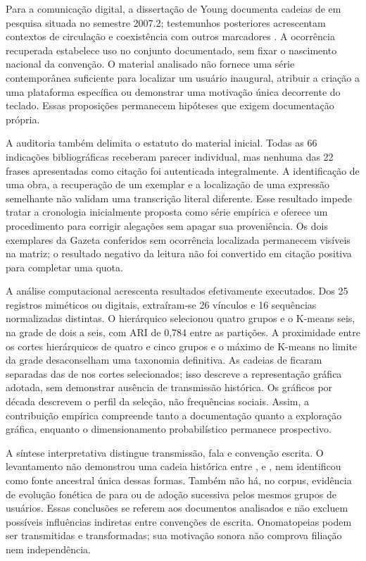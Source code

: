 Para a comunicação digital, a dissertação de Young documenta cadeias de  em pesquisa situada no semestre 2007.2; testemunhos posteriores acrescentam contextos de circulação e coexistência com outros marcadores \cite{young2008,leao2010,silva2015}. A ocorrência recuperada estabelece uso no conjunto documentado, sem fixar o nascimento nacional da convenção. O material analisado não fornece uma série contemporânea suficiente para localizar um usuário inaugural, atribuir a criação a uma plataforma específica ou demonstrar uma motivação única decorrente do teclado. Essas proposições permanecem hipóteses que exigem documentação própria.

A auditoria também delimita o estatuto do material inicial. Todas as 66 indicações bibliográficas receberam parecer individual, mas nenhuma das 22 frases apresentadas como citação foi autenticada integralmente. A identificação de uma obra, a recuperação de um exemplar e a localização de uma expressão semelhante não validam uma transcrição literal diferente. Esse resultado impede tratar a cronologia inicialmente proposta como série empírica e oferece um procedimento para corrigir alegações sem apagar sua proveniência. Os dois exemplares da Gazeta conferidos sem ocorrência localizada permanecem visíveis na matriz; o resultado negativo da leitura não foi convertido em citação positiva para completar uma quota.

A análise computacional acrescenta resultados efetivamente executados. Dos 25 registros miméticos ou digitais, extraíram-se 26 vínculos e 16 sequências normalizadas distintas. O hierárquico selecionou quatro grupos e o K-means seis, na grade de dois a seis, com ARI de 0,784 entre as partições. A proximidade entre os cortes hierárquicos de quatro e cinco grupos e o máximo de K-means no limite da grade desaconselham uma taxonomia definitiva. As cadeias de  ficaram separadas das de  nos cortes selecionados; isso descreve a representação gráfica adotada, sem demonstrar ausência de transmissão histórica. Os gráficos por década descrevem o perfil da seleção, não frequências sociais. Assim, a contribuição empírica compreende tanto a documentação quanto a exploração gráfica, enquanto o dimensionamento probabilístico permanece prospectivo.

A síntese interpretativa distingue transmissão, fala e convenção escrita. O levantamento não demonstrou uma cadeia histórica entre ,  e , nem identificou  como fonte ancestral única dessas formas. Também não há, no corpus, evidência de evolução fonética de  para  ou de adoção sucessiva pelos mesmos grupos de usuários. Essas conclusões se referem aos documentos analisados e não excluem possíveis influências indiretas entre convenções de escrita. Onomatopeias podem ser transmitidas e transformadas; sua motivação sonora não comprova filiação nem independência.

